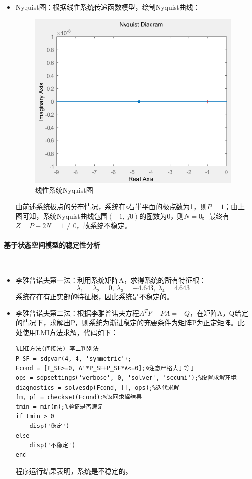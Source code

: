 \documentclass[UTF8]{article}
\begin{document}
\begin{itemize}
\item Nyquist图：根据线性系统传递函数模型，绘制Nyquist曲线：
\begin{figure}[H]
    \centering %
    \includegraphics[width=.6\textwidth]{figure/倒立摆-奈氏曲线.png} 
    \caption{线性系统Nyquist图} %
\end{figure}
由前述系统极点的分布情况，系统在s右半平面的极点数为1，则$P = 1$；由上图可知，系统Nyquist曲线包围$(-1,\ j0)$的圈数为0，则$N = 0$。最终有$Z = P - 2N = 1 \ne 0$，故系统不稳定。

\end{itemize}

\paragraph{基于状态空间模型的稳定性分析}~{}

\begin{itemize}

\item 李雅普诺夫第一法：利用系统矩阵A，求得系统的所有特征根：
\begin{equation*}
	\lambda_1 = \lambda_2 = 0,\ \lambda_3 = -4.643,\ \lambda_4 = 4.643
\end{equation*}
系统存在有正实部的特征根，因此系统是不稳定的。

\item 李雅普诺夫第二法：根据李雅普诺夫方程$A^TP + PA = -Q$，在矩阵A，Q给定的情况下，求解出P，则系统为渐进稳定的充要条件为矩阵P为正定矩阵。此处使用LMI方法求解，代码如下：
\begin{lstlisting}
%LMI方法(间接法) 李二判别法
P_SF = sdpvar(4, 4, 'symmetric');
Fcond = [P_SF>=0, A'*P_SF+P_SF*A<=0];%注意严格大于等于
ops = sdpsettings('verbose', 0, 'solver', 'sedumi');%设置求解环境
diagnostics = solvesdp(Fcond, [], ops);%迭代求解
[m, p] = checkset(Fcond);%返回求解结果
tmin = min(m);%验证是否满足
if tmin > 0
    disp('稳定')
else 
    disp('不稳定')
end
\end{lstlisting}
程序运行结果表明，系统是不稳定的。

\end{itemize}
\end{document}
